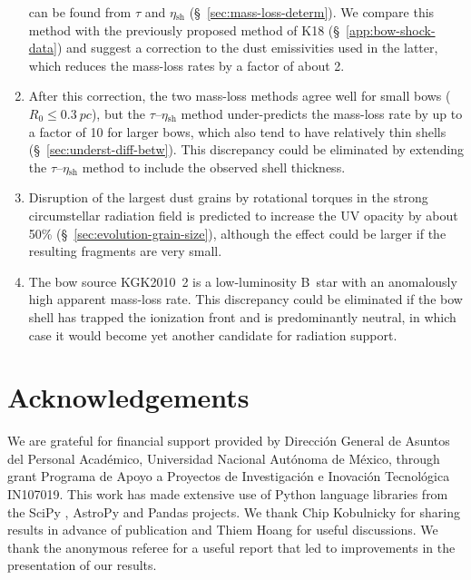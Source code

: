 \documentclass[useAMS, usenatbib, a4paper]{mnras}
\newcommand\shell{\ensuremath{_{\text{sh}}}}
\begin{document}
\begin{enumerate}[1.]
  can be found from \(\tau\) and \(\eta\shell\)
  (\S~\ref{sec:mass-loss-determ}). We compare this method with the
  previously proposed method of K18 (\S~\ref{app:bow-shock-data}) and
  suggest a correction to the dust emissivities used in the latter,
  which reduces the mass-loss rates by a factor of about 2.
\item After this correction, the two mass-loss methods agree well for
  small bows (\(R_0 \le \SI{0.3}{pc}\)), but the
  \(\tau\)--\(\eta\shell\) method under-predicts the mass-loss rate by
  up to a factor of 10 for larger bows, which also tend to have
  relatively thin shells (\S~\ref{sec:underst-diff-betw}).  This
  discrepancy could be eliminated by extending the
  \(\tau\)--\(\eta\shell\) method to include the observed shell
  thickness.
\item Disruption of the largest dust grains by rotational torques in
  the strong circumstellar radiation field is predicted to increase
  the UV opacity by about 50\% (\S~\ref{sec:evolution-grain-size}),
  although the effect could be larger if the resulting fragments are
  very small.
\item The bow source KGK2010~2 is a low-luminosity B~star with an
  anomalously high apparent mass-loss rate.  This discrepancy could be
  eliminated if the bow shell has trapped the ionization front and is
  predominantly neutral, in which case it would become yet another
  candidate for radiation support.
\end{enumerate}


\section*{Acknowledgements}
We are grateful for financial support provided by Dirección General de
Asuntos del Personal Académico, Universidad Nacional Autónoma de
México, through grant Programa de Apoyo a Proyectos de Investigación e
Inovación Tecnológica IN107019.  This work has made extensive use of
Python language libraries from the SciPy \citep{Jones:2001a}, AstroPy
\citep{Astropy-Collaboration:2013a, Astropy-Collaboration:2018a} and
Pandas \citep{McKinney:2010a} projects.  We thank Chip Kobulnicky for
sharing results in advance of publication and Thiem Hoang for useful
discussions.  We thank the anonymous referee for a useful report that
led to improvements in the presentation of our results.
\end{document}
